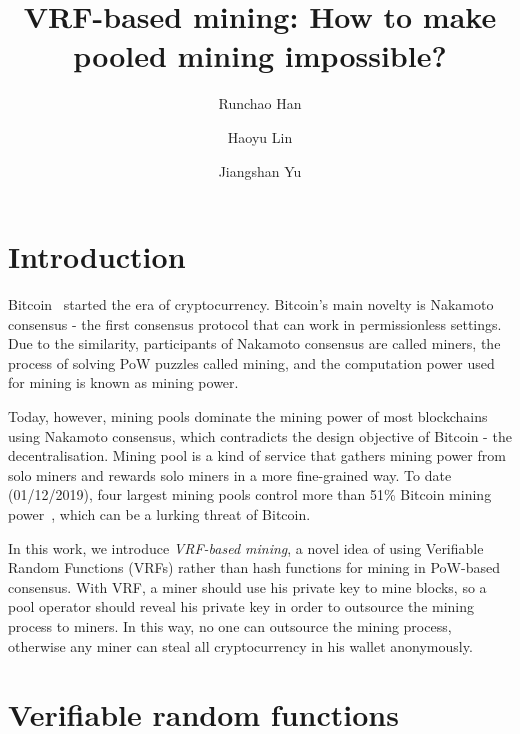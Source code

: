 \documentclass[sigconf]{acmart}
\begin{document}
\title{VRF-based mining: How to make pooled mining impossible?}

\author{Runchao Han}

\author{Haoyu Lin}
\affiliation{}

\author{Jiangshan Yu}

\maketitle




\section{Introduction}
\label{sec:intro}

Bitcoin~\cite{nakamoto2008bitcoin} started the era of cryptocurrency.
Bitcoin's main novelty is Nakamoto consensus - the first consensus protocol that can work in permissionless settings.
Due to the similarity, participants of Nakamoto consensus are called miners, the process of solving PoW puzzles called mining, and the computation power used for mining is known as mining power.

Today, however, mining pools dominate the mining power of most blockchains using Nakamoto consensus, which contradicts the design objective of Bitcoin - the decentralisation.
Mining pool is a kind of service that gathers mining power from solo miners and rewards solo miners in a more fine-grained way.
To date (01/12/2019), four largest mining pools control more than 51\% Bitcoin mining power~\cite{btc-com}, which can be a lurking threat of Bitcoin.

In this work, we introduce \textit{VRF-based mining}, a novel idea of using Verifiable Random Functions (VRFs) rather than hash functions for mining in PoW-based consensus.
With VRF, a miner should use his private key to mine blocks, so a pool operator should reveal his private key in order to outsource the mining process to miners.
In this way, no one can outsource the mining process, otherwise any miner can steal all cryptocurrency in his wallet anonymously.



\section{Verifiable random functions}
\end{document}
